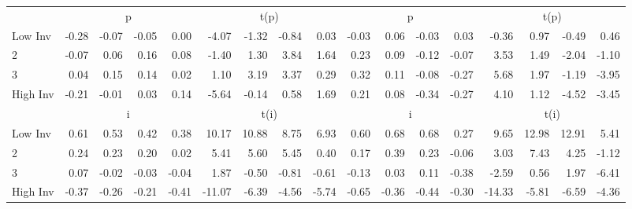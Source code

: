 \begin{table}[!ht]
\begin{tabular}{lrrrrrrrrrrrrrrrr}
  
    
      & \multicolumn{4}{c}{p} & \multicolumn{4}{c}{t(p)}
    
      & \multicolumn{4}{c}{p} & \multicolumn{4}{c}{t(p)}
    
    \\
      \cmidrule(r){2-5} \cmidrule(r){6-9} \cmidrule(r){10-13} \cmidrule(r){14-17}

    Low Inv   & -0.28  & -0.07  & -0.05  & 0.00  & -4.07  & -1.32  & -0.84  & 0.03  & -0.03  & 0.06  & -0.03  & 0.03  & -0.36  & 0.97  & -0.49  & 0.46  \\
           2  & -0.07  & 0.06  & 0.16  & 0.08  & -1.40  & 1.30  & 3.84  & 1.64  & 0.23  & 0.09  & -0.12  & -0.07  & 3.53  & 1.49  & -2.04  & -1.10  \\
           3  & 0.04  & 0.15  & 0.14  & 0.02  & 1.10  & 3.19  & 3.37  & 0.29  & 0.32  & 0.11  & -0.08  & -0.27  & 5.68  & 1.97  & -1.19  & -3.95  \\
    High Inv  & -0.21  & -0.01  & 0.03  & 0.14  & -5.64  & -0.14  & 0.58  & 1.69  & 0.21  & 0.08  & -0.34  & -0.27  & 4.10  & 1.12  & -4.52  & -3.45  \\

  
    
      & \multicolumn{4}{c}{i} & \multicolumn{4}{c}{t(i)}
    
      & \multicolumn{4}{c}{i} & \multicolumn{4}{c}{t(i)}
    
    \\
      \cmidrule(r){2-5} \cmidrule(r){6-9} \cmidrule(r){10-13} \cmidrule(r){14-17}

    Low Inv   & 0.61  & 0.53  & 0.42  & 0.38  & 10.17  & 10.88  & 8.75  & 6.93  & 0.60  & 0.68  & 0.68  & 0.27  & 9.65  & 12.98  & 12.91  & 5.41  \\
           2  & 0.24  & 0.23  & 0.20  & 0.02  & 5.41  & 5.60  & 5.45  & 0.40  & 0.17  & 0.39  & 0.23  & -0.06  & 3.03  & 7.43  & 4.25  & -1.12  \\
           3  & 0.07  & -0.02  & -0.03  & -0.04  & 1.87  & -0.50  & -0.81  & -0.61  & -0.13  & 0.03  & 0.11  & -0.38  & -2.59  & 0.56  & 1.97  & -6.41  \\
    High Inv  & -0.37  & -0.26  & -0.21  & -0.41  & -11.07  & -6.39  & -4.56  & -5.74  & -0.65  & -0.36  & -0.44  & -0.30  & -14.33  & -5.81  & -6.59  & -4.36  \\

  

  \bottomrule
\end{tabular}
\label{tbl:32_Size_BM_Inv_F16}
\end{table}